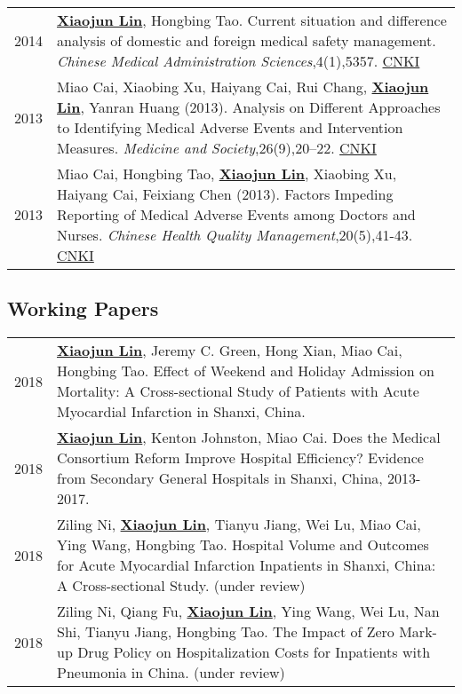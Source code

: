 \documentclass[a4paper,10pt]{article}
\begin{document}
\begin{longtable}{r p{13cm}}
2014 & \underline{\textbf{Xiaojun Lin}}, Hongbing Tao. Current situation and difference analysis of domestic and foreign medical safety management. \emph{Chinese Medical Administration Sciences},4(1),5357. \href{http://kns.cnki.net/KCMS/detail/detail.aspx?dbcode=CJFQ&dbname=CJFD2014&filename=YLGL201401019&v=MjQzMzVUcldNMUZyQ1VSTEtlWnVadEZpRG5WNy9JUENITVlyRzRIOVhNcm85RWJZUjhlWDFMdXhZUzdEaDFUM3E=}{CNKI}\\
2013 & Miao Cai, Xiaobing Xu, Haiyang Cai, Rui Chang, \underline{\textbf{Xiaojun Lin}}, Yanran Huang (2013). Analysis on Different Approaches to Identifying Medical Adverse Events and Intervention Measures. \emph{Medicine and Society},26(9),20–22. \href{http://kns.cnki.net/KCMS/detail/detail.aspx?dbcode=CJFQ&dbname=CJFDHIS2&filename=YXSH201309007&v=MDAwNDFyQ1VSTEtlWnVac0Zpdm1XcnZOUERYWVpyRzRIOUxNcG85Rlk0UjhlWDFMdXhZUzdEaDFUM3FUcldNMUY=}{CNKI}\\
2013 & Miao Cai, Hongbing Tao, \underline{\textbf{Xiaojun Lin}}, Xiaobing Xu, Haiyang Cai, Feixiang Chen (2013). Factors Impeding Reporting of Medical Adverse Events among Doctors and Nurses. \emph{Chinese Health Quality Management},20(5),41-43. \href{http://kns.cnki.net/KCMS/detail/detail.aspx?dbcode=CJFQ&dbname=CJFDHIS2&filename=WSJG201305024&v=Mjc4MDIxTHV4WVM3RGgxVDNxVHJXTTFGckNVUkxLZVp1WnNGaXZuVXJ6Tk1qN0JhYkc0SDlMTXFvOUhZSVI4ZVg=}{CNKI}\\
\end{longtable}


\subsection*{Working Papers}
\begin{longtable}{r p{13cm}}
2018 & \underline{\textbf{Xiaojun Lin}}, Jeremy C. Green, Hong Xian, Miao Cai, Hongbing Tao. Effect of Weekend and Holiday Admission on Mortality: A Cross-sectional Study of Patients with Acute Myocardial Infarction in Shanxi, China.\\
2018 & \underline{\textbf{Xiaojun Lin}}, Kenton Johnston, Miao Cai. Does the Medical Consortium Reform Improve Hospital Efficiency? Evidence from Secondary General Hospitals in Shanxi, China, 2013-2017.\\
2018 & Ziling Ni, \underline{\textbf{Xiaojun Lin}}, Tianyu Jiang, Wei Lu, Miao Cai, Ying Wang, Hongbing Tao. Hospital Volume and Outcomes for Acute Myocardial Infarction Inpatients in Shanxi, China: A Cross-sectional Study. (under review)\\
2018 & Ziling Ni, Qiang Fu, \underline{\textbf{Xiaojun Lin}}, Ying Wang, Wei Lu, Nan Shi, Tianyu Jiang, Hongbing Tao. The Impact of Zero Mark-up Drug Policy on Hospitalization Costs for Inpatients with Pneumonia in China. (under review)\\
\end{longtable}
\end{document}
